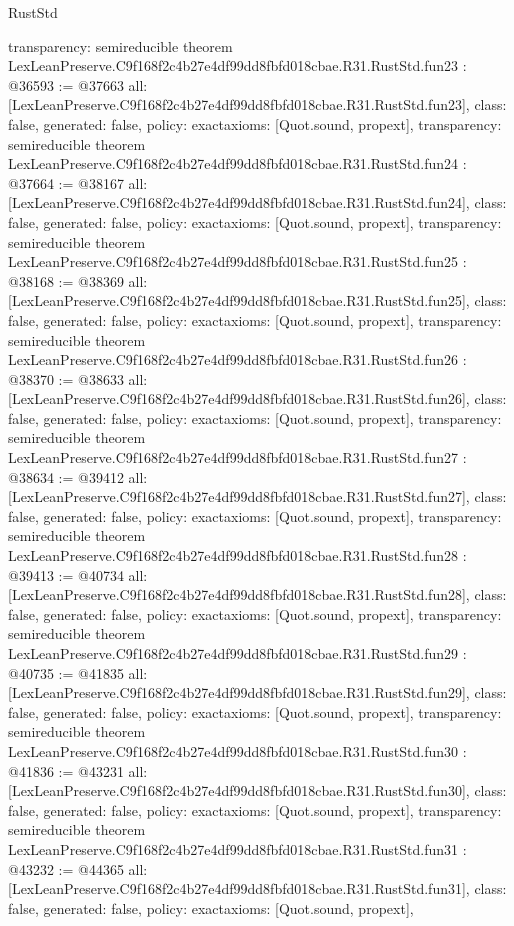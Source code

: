 \begin{lexlean}{RustStd}
\begin{coremodule}
{  transparency: semireducible
}
theorem LexLeanPreserve.C9f168f2c4b27e4df99dd8fbfd018cbae.R31.RustStd.fun23 : @36593 := @37663 {
  all: [LexLeanPreserve.C9f168f2c4b27e4df99dd8fbfd018cbae.R31.RustStd.fun23],
  class: false,
  generated: false,
  policy: exact{axioms: [Quot.sound, propext]},
  transparency: semireducible
}
theorem LexLeanPreserve.C9f168f2c4b27e4df99dd8fbfd018cbae.R31.RustStd.fun24 : @37664 := @38167 {
  all: [LexLeanPreserve.C9f168f2c4b27e4df99dd8fbfd018cbae.R31.RustStd.fun24],
  class: false,
  generated: false,
  policy: exact{axioms: [Quot.sound, propext]},
  transparency: semireducible
}
theorem LexLeanPreserve.C9f168f2c4b27e4df99dd8fbfd018cbae.R31.RustStd.fun25 : @38168 := @38369 {
  all: [LexLeanPreserve.C9f168f2c4b27e4df99dd8fbfd018cbae.R31.RustStd.fun25],
  class: false,
  generated: false,
  policy: exact{axioms: [Quot.sound, propext]},
  transparency: semireducible
}
theorem LexLeanPreserve.C9f168f2c4b27e4df99dd8fbfd018cbae.R31.RustStd.fun26 : @38370 := @38633 {
  all: [LexLeanPreserve.C9f168f2c4b27e4df99dd8fbfd018cbae.R31.RustStd.fun26],
  class: false,
  generated: false,
  policy: exact{axioms: [Quot.sound, propext]},
  transparency: semireducible
}
theorem LexLeanPreserve.C9f168f2c4b27e4df99dd8fbfd018cbae.R31.RustStd.fun27 : @38634 := @39412 {
  all: [LexLeanPreserve.C9f168f2c4b27e4df99dd8fbfd018cbae.R31.RustStd.fun27],
  class: false,
  generated: false,
  policy: exact{axioms: [Quot.sound, propext]},
  transparency: semireducible
}
theorem LexLeanPreserve.C9f168f2c4b27e4df99dd8fbfd018cbae.R31.RustStd.fun28 : @39413 := @40734 {
  all: [LexLeanPreserve.C9f168f2c4b27e4df99dd8fbfd018cbae.R31.RustStd.fun28],
  class: false,
  generated: false,
  policy: exact{axioms: [Quot.sound, propext]},
  transparency: semireducible
}
theorem LexLeanPreserve.C9f168f2c4b27e4df99dd8fbfd018cbae.R31.RustStd.fun29 : @40735 := @41835 {
  all: [LexLeanPreserve.C9f168f2c4b27e4df99dd8fbfd018cbae.R31.RustStd.fun29],
  class: false,
  generated: false,
  policy: exact{axioms: [Quot.sound, propext]},
  transparency: semireducible
}
theorem LexLeanPreserve.C9f168f2c4b27e4df99dd8fbfd018cbae.R31.RustStd.fun30 : @41836 := @43231 {
  all: [LexLeanPreserve.C9f168f2c4b27e4df99dd8fbfd018cbae.R31.RustStd.fun30],
  class: false,
  generated: false,
  policy: exact{axioms: [Quot.sound, propext]},
  transparency: semireducible
}
theorem LexLeanPreserve.C9f168f2c4b27e4df99dd8fbfd018cbae.R31.RustStd.fun31 : @43232 := @44365 {
  all: [LexLeanPreserve.C9f168f2c4b27e4df99dd8fbfd018cbae.R31.RustStd.fun31],
  class: false,
  generated: false,
  policy: exact{axioms: [Quot.sound, propext]},
}
\end{coremodule}
\end{lexlean}
